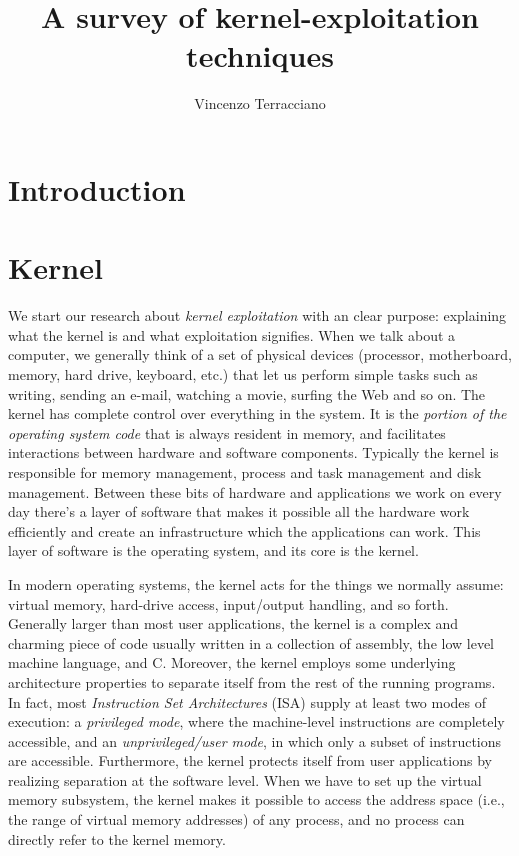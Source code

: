 \documentclass{masterthesis}
\begin{document}
\title{A survey of kernel-exploitation techniques}

\author{Vincenzo Terracciano}


\examiner{_______ ______}

\maketitle

\tableofcontents

\chapter{Introduction}

\chapter{Kernel}
\label{ch:kernel}

We start our research about \emph{kernel exploitation} with an clear purpose: explaining what the kernel is and what exploitation signifies.
When we talk about a computer, we generally think of a set of physical devices (processor, motherboard, memory, hard drive, keyboard, etc.) that let us  perform simple tasks such as writing, sending an e-mail, watching a movie, surfing the Web and so on.
The kernel has complete control over everything in the system. It is the \emph{portion of the operating system code} that is always resident in memory, and facilitates interactions between hardware and software components.
Typically the kernel is responsible for memory management, process and task management and disk management.
Between these bits of hardware and applications we work on every day there's a layer of software that makes it possible all the hardware work efficiently and create an infrastructure which the applications can work.
This layer of software is the operating system, and its core is the kernel.

In modern operating systems, the kernel acts for the things we normally assume: virtual memory, hard-drive access, input/output handling, and so forth. Generally larger than most user applications, the kernel is a complex and charming piece of code usually written in a collection of assembly, the low level machine language, and C.
Moreover, the kernel employs some underlying architecture properties to separate itself from the rest of the running programs.
In fact, most \emph{Instruction Set Architectures} (ISA) supply at least two modes of execution: a \emph{privileged mode}, where the machine-level instructions are completely accessible, and an \emph{unprivileged/user mode}, in which only a subset of instructions are accessible.
Furthermore, the kernel protects itself from user applications by realizing separation at the software level.
When we have to set up the virtual memory subsystem, the kernel makes it possible to access the address space (i.e., the range of virtual memory addresses) of any process, and no process can directly refer to the kernel memory.
\end{document}

